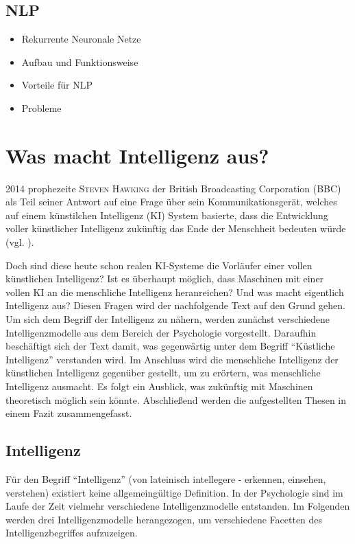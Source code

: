 \documentclass[a4paper, 11pt]{scrartcl}
\begin{document}
\subsection{NLP}
\begin{itemize}
  \item Rekurrente Neuronale Netze
  \item Aufbau und Funktionsweise
  \item Vorteile für NLP
  \item Probleme
\end{itemize}

\newpage

\section{Was macht Intelligenz aus?}

2014 prophezeite \textsc{Steven Hawking} der British Broadcasting Corporation (BBC) als Teil seiner Antwort auf eine Frage über sein Kommunikationsgerät, welches auf einem künstilchen Intelligenz (KI) System basierte, dass die Entwicklung voller künstlicher Intelligenz zukünftig das Ende der Menschheit bedeuten würde (vgl. \cite{BBC2014}).

Doch sind diese heute schon realen KI-Systeme die Vorläufer einer vollen künstlichen Intelligenz? Ist es überhaupt möglich, dass Maschinen mit einer vollen KI an die menschliche Intelligenz heranreichen? Und was macht eigentlich Intelligenz aus? Diesen Fragen wird der nachfolgende Text auf den Grund gehen. Um sich dem Begriff der Intelligenz zu nähern, werden zunächst verschiedene Intelligenzmodelle aus dem Bereich der Psychologie vorgestellt. Daraufhin beschäftigt sich der Text damit, was gegenwärtig unter dem Begriff ``Küstliche Intelligenz'' verstanden wird. Im Anschluss wird die menschliche Intelligenz der künstlichen Intelligenz gegenüber gestellt, um zu erörtern, was menschliche Intelligenz ausmacht. Es folgt ein Ausblick, was zukünftig mit Maschinen theoretisch möglich sein könnte. Abschließend werden die aufgestellten Thesen in einem Fazit zusammengefasst.

\subsection{Intelligenz}
Für den Begriff ``Intelligenz'' (von lateinisch intellegere - erkennen, einsehen, verstehen) existiert keine allgemeingültige Definition. In der Psychologie sind im Laufe der Zeit vielmehr verschiedene Intelligenzmodelle entstanden. Im Folgenden werden drei Intelligenzmodelle herangezogen, um verschiedene Facetten des Intelligenzbegriffes aufzuzeigen.
\end{document}
